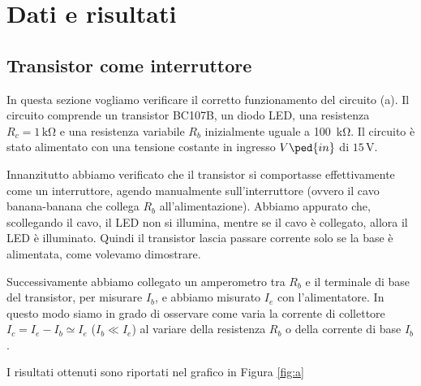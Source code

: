 \section*{Dati e risultati}

\subsection*{Transistor come interruttore}

In questa sezione vogliamo verificare il corretto funzionamento del circuito (a).
Il circuito comprende un transistor BC107B, un diodo LED, una resistenza $R_c=1\,\si{\kilo\ohm}$ e una resistenza variabile $R_b$ inizialmente uguale a \SI{100}{\kilo\ohm}. Il circuito è stato alimentato con una tensione costante in ingresso $V\ped{in}$ di $15\,\si{\volt}$.

Innanzitutto abbiamo verificato che il transistor si comportasse effettivamente come un interruttore, agendo manualmente sull'interruttore (ovvero il cavo banana-banana che collega $R_b$ all'alimentazione). Abbiamo appurato che, scollegando il cavo, il LED non si illumina, mentre se il cavo è collegato, allora il LED è illuminato. Quindi il transistor lascia passare corrente solo se la base è alimentata, come volevamo dimostrare.

Successivamente abbiamo collegato un amperometro tra $R_b$ e il terminale di base del transistor, per misurare $I_b$, e abbiamo misurato $I_e$ con l'alimentatore. In questo modo siamo in grado di osservare come varia la corrente di collettore $I_c = I_e - I_b \simeq I_e$ ($I_b \ll I_e$) al variare della resistenza $R_b$ o della corrente di base $I_b$.

I risultati ottenuti sono riportati nel grafico in Figura \ref{fig:a}

